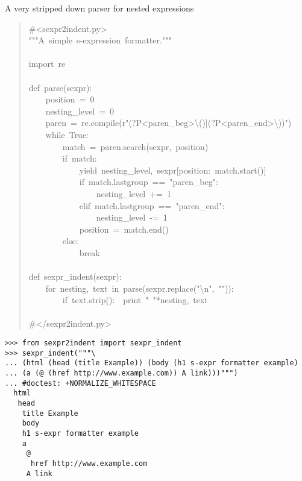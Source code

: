 \documentclass[10pt,a4paper,english]{article}
\begin{document}
A very stripped down parser for nested expressions
\begin{quote}{\ttfamily \raggedright \noindent
{\#}<sexpr2indent.py>~\\
"{}"{}"A~simple~s-expression~formatter."{}"{}"~\\
~\\
import~re~\\
~\\
def~parse(sexpr):~\\
~~~~position~=~0~\\
~~~~nesting{\_}level~=~0~\\
~~~~paren~=~re.compile(r"(?P<paren{\_}beg>{\textbackslash}()|(?P<paren{\_}end>{\textbackslash}))")~\\
~~~~while~True:~\\
~~~~~~~~match~=~paren.search(sexpr,~position)~\\
~~~~~~~~if~match:~\\
~~~~~~~~~~~~yield~nesting{\_}level,~sexpr{[}position:~match.start()]~\\
~~~~~~~~~~~~if~match.lastgroup~==~"paren{\_}beg":~\\
~~~~~~~~~~~~~~~~nesting{\_}level~+=~1~\\
~~~~~~~~~~~~elif~match.lastgroup~==~"paren{\_}end":~\\
~~~~~~~~~~~~~~~~nesting{\_}level~-=~1~\\
~~~~~~~~~~~~position~=~match.end()~\\
~~~~~~~~else:~\\
~~~~~~~~~~~~break~\\
~\\
def~sexpr{\_}indent(sexpr):~\\
~~~~for~nesting,~text~in~parse(sexpr.replace("{\textbackslash}n",~"{}")):~\\
~~~~~~~~if~text.strip():~~print~"~"*nesting,~text~\\
~\\
{\#}</sexpr2indent.py>
}\end{quote}
\begin{verbatim}>>> from sexpr2indent import sexpr_indent
>>> sexpr_indent("""\
... (html (head (title Example)) (body (h1 s-expr formatter example)
... (a (@ (href http://www.example.com)) A link)))""")
... #doctest: +NORMALIZE_WHITESPACE
  html
   head
    title Example
    body
    h1 s-expr formatter example
    a
     @
      href http://www.example.com
     A link\end{verbatim}


\end{document}

